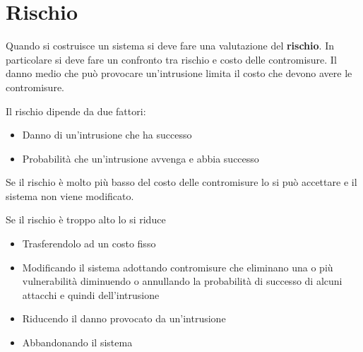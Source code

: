 \section{Rischio}
Quando si costruisce un sistema si deve fare una valutazione del \textbf{rischio}. In particolare si deve fare un
confronto tra rischio e costo delle contromisure. Il danno medio che può provocare un'intrusione limita il costo che
devono avere le contromisure.

Il rischio dipende da due fattori:
\begin{itemize}
	\item Danno di un'intrusione che ha successo
	\item Probabilità che un'intrusione avvenga e abbia successo
\end{itemize}
Se il rischio è molto più basso del costo delle contromisure lo si può accettare e il sistema non viene modificato.

Se il rischio è troppo alto lo si riduce
\begin{itemize}
	\item Trasferendolo ad un costo fisso
	\item Modificando il sistema adottando contromisure che eliminano una o più vulnerabilità diminuendo o annullando
	      la probabilità di successo di alcuni attacchi e quindi dell'intrusione
	\item Riducendo il danno provocato da un'intrusione
	\item Abbandonando il sistema
\end{itemize}